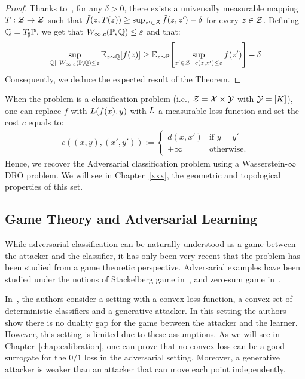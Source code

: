 \begin{proof}
    Thanks to~\citet[Proposition 7.50]{bertsekas2004stochastic}, for any $\delta>0$, there exists a universally measurable mapping $T:\mathcal{Z}\to\mathcal{Z}$ such that $\tilde{f}(z,T(z))\geq \sup_{z'\in\mathcal{Z}} \Tilde{f}(z,z') -\delta $ for every $z\in\mathcal{Z}$. Defining $\mathbb{Q} =T_\sharp\mathbb{P}$, we get that $W_{\infty,c}(\mathbb{P},\mathbb{Q})\leq \varepsilon$ and that:
    \begin{align*}
        \sup_{\QQ|~W_{\infty,c}(\PP,\QQ)\leq \varepsilon}\mathbb{E}_{z\sim\QQ}\left[f(z)\right] \geq\mathbb{E}_{z\sim\PP}\left[\sup_{z'\in \ZZ|~c(z,z')\leq\varepsilon} f(z')\right]-\delta
    \end{align*}
Consequently, we deduce the expected result of the Theorem.
\end{proof}
    

When the problem is a classification problem (i.e., $\mathcal{Z}=\mathcal{X}\times\mathcal{Y}$ with $\mathcal{Y} = [K]$), one can replace $f$ with  $L(f(x),y)$ with $L$ a measurable loss function and set the cost $c$ equals to:
\begin{align*}
    c((x,y),(x',y')) := \left\{
        \begin{array}{ll}
            d(x,x') & \mbox{if } y = y'\\
            +\infty & \mbox{otherwise.}
        \end{array}
    \right.
\end{align*} 
Hence, we recover the Adversarial classification problem using a Wasserstein-$\infty$ DRO problem. We will see in Chapter~\ref{xxx}, the geometric and topological properties of this set. 


\subsection{Game Theory and Adversarial Learning}

While adversarial classification can be naturally understood as a game between the attacker and the classifier, it has only been very recent that the problem has been studied from a game theoretic perspective. Adversarial examples have been studied under  the notions of Stackelberg game in~\cite{10.1145/2020408.2020495}, and  zero-sum game in~\cite{7533509,DBLP:journals/corr/abs-1906-02816,bose2021adversarial}.


In~\citep{bose2021adversarial}, the authors consider a setting with a convex loss function, a convex set of deterministic classifiers and a generative attacker. In this setting the authors show there is no duality gap for the game between the attacker and the learner. However, this setting is limited due to these assumptions. As we will see in Chapter~\ref{chap:calibration}, one can prove that no convex loss can be a good surrogate for the $0/1$ loss in the adversarial setting. Moreover, a generative attacker is weaker than an attacker that can move each point independently.

